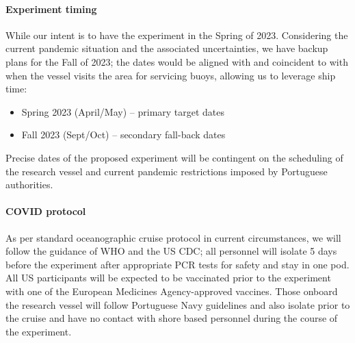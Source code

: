 \paragraph{Experiment timing} While our intent is to have the
experiment in the Spring of 2023. Considering the current pandemic
situation and the associated uncertainties, we have backup plans for
the Fall of 2023; the dates would be aligned with and coincident to
with when the \inst vessel visits the \naz area for servicing buoys,
allowing us to leverage ship time:

\begin{itemize}[noitemsep,topsep=0pt,parsep=0pt,partopsep=0pt]
\vspace{+0.25cm}

\item Spring 2023 (April/May) -- primary target dates
\item Fall 2023 (Sept/Oct) -- secondary fall-back dates

\end{itemize}

\noindent
Precise dates of the proposed experiment will be contingent on the
scheduling of the \inst research vessel and current pandemic
restrictions imposed by Portuguese authorities.

\paragraph{COVID protocol} As per standard oceanographic cruise
protocol in current circumstances, we will follow the guidance of WHO
and the US CDC; all personnel will isolate 5 days before the
experiment after appropriate PCR tests for safety and stay in one
pod. All US participants will be expected to be vaccinated prior to
the experiment with one of the European Medicines Agency-approved
vaccines. Those onboard the \inst research vessel will follow
Portuguese Navy guidelines and also isolate prior to the cruise and
have no contact with shore based personnel during the course of the
experiment.
